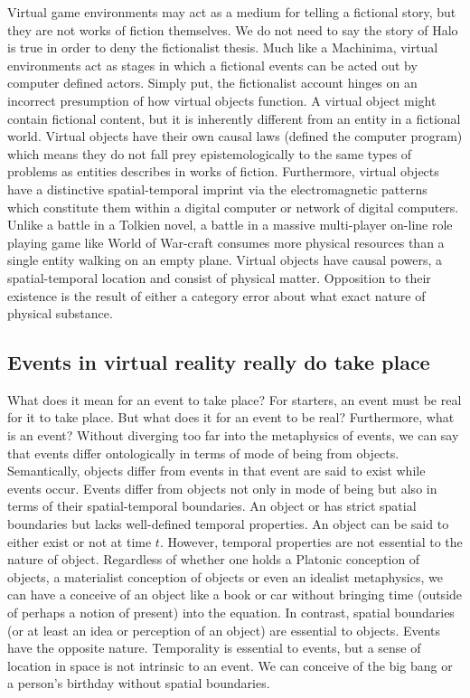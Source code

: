  
 Virtual game environments may act as a medium for telling a fictional story, but they are not works of fiction themselves. We do not need to say the story of Halo is true in order to deny the fictionalist thesis. Much like a Machinima, virtual environments act as stages in which a fictional events can be acted out by computer defined actors. Simply put, the fictionalist account hinges on an incorrect presumption of how virtual objects function. A virtual object might contain fictional content, but it is inherently different from an entity in a fictional world. Virtual objects have their own causal laws (defined the computer program) which means they do not fall prey epistemologically to the same types of problems as entities describes in works of fiction. Furthermore, virtual objects have a distinctive spatial-temporal imprint via the electromagnetic patterns which constitute them within a digital computer or network of digital computers. Unlike a battle in a Tolkien novel, a battle in a massive multi-player on-line role playing game like World of War-craft consumes more physical resources than a single entity walking on an empty plane. Virtual objects have causal powers, a spatial-temporal location and consist of physical matter. Opposition to their existence is the result of either a  category error about what exact nature of physical substance.
\subsection{Events in virtual reality really do take place}
What does it mean for an event to take place? For starters, an event must be real for it to take place. But what does it for an event to be real? Furthermore, what is an event? Without diverging too far into the metaphysics of events, we can say that events differ ontologically in terms of mode of being from objects. Semantically, objects differ from events in that event are said to exist while events occur. \cite{10.2307/4619602}
Events differ from objects not only in mode of being but also in terms of their spatial-temporal boundaries. An object or has strict spatial boundaries but lacks well-defined temporal properties. An object can be said to either exist or not at time $t$. However, temporal properties are not essential to the nature of object. Regardless of whether one holds a Platonic conception of objects, a materialist conception of objects or even an idealist metaphysics, we can have a conceive of an object like a book or car without bringing time (outside of perhaps a notion of present) into the equation. In contrast, spatial boundaries (or at least an idea or perception of an object) are essential to objects. Events have the opposite nature. Temporality is essential to events, but a sense of location in space is not intrinsic to an event. We can conceive of the big bang or a person's birthday without spatial boundaries.


